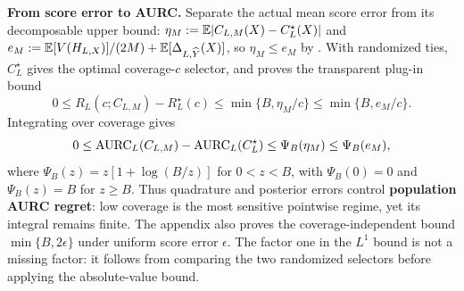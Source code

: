 \noindent\textbf{From score error to AURC.}
Separate the actual mean score error from its decomposable upper bound:
\(\eta_M:=\mathbb{E}|C_{L,M}(X)-C_L^\star(X)|\) and
\(e_M:=\mathbb{E}[V(H_{L,X})]/(2M)+\mathbb{E}[\Delta_{L,\widehat{Y}}(X)]\), so
\(\eta_M\leq e_M\) by . With randomized ties,
\(C_L^\star\) gives the optimal coverage-\(c\) selector, and
 proves the transparent plug-in bound
\begin{equation*}
  0\leq R_L(c;C_{L,M})-R_L^\star(c)
  \leq\min\{B,\eta_M/c\}
  \leq\min\{B,e_M/c\}.
\end{equation*}
Integrating over coverage gives
\begin{equation*}
  0\leq\operatorname{AURC}_L(C_{L,M})-\operatorname{AURC}_L(C_L^\star)
  \leq\Psi_B(\eta_M)\leq\Psi_B(e_M),
\end{equation*}
where \(\Psi_B(z)=z[1+\log(B/z)]\) for \(0<z<B\), with
\(\Psi_B(0)=0\) and \(\Psi_B(z)=B\) for \(z\geq B\). Thus quadrature and
posterior errors control \textbf{population AURC regret}: low coverage is the
most sensitive pointwise regime, yet its integral remains finite. The appendix
also proves the coverage-independent bound \(\min\{B,2\epsilon\}\) under
uniform score error \(\epsilon\). The factor one in the \(L^1\) bound is not a
missing factor: it follows from comparing the two randomized selectors before
applying the absolute-value bound.

